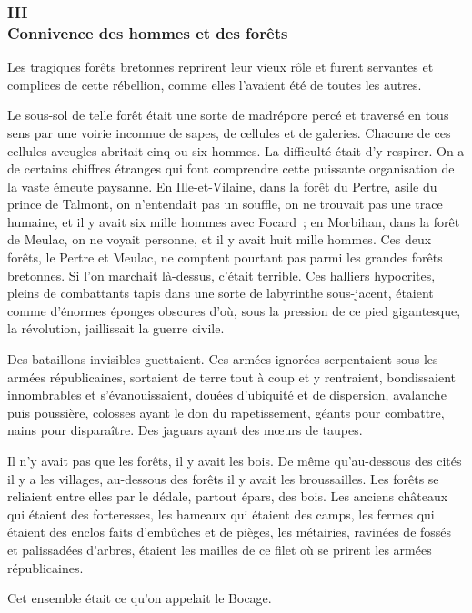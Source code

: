 \documentclass[french,twoside]{book} %
\begin{document}
 \subsubsection[{III. Connivence des hommes et des forêts}]{III \\
Connivence des hommes et des forêts}
\label{p3l1c3}
\noindent Les tragiques forêts bretonnes reprirent leur vieux rôle et furent servantes et complices de cette rébellion, comme elles l’avaient été de toutes les autres.\par
Le sous-sol de telle forêt était une sorte de madrépore percé et traversé en tous sens par une voirie inconnue de sapes, de cellules et de galeries. Chacune de ces cellules aveugles abritait cinq ou six hommes. La difficulté était d’y respirer. On a de certains chiffres étranges qui font comprendre cette puissante organisation de la vaste émeute paysanne. En Ille-et-Vilaine, dans la forêt du Pertre, asile du prince de Talmont, on n’entendait pas un souffle, on ne trouvait pas une trace humaine, et il y avait six mille hommes avec Focard ; en Morbihan, dans la forêt de Meulac, on ne voyait personne, et il y avait huit mille hommes. Ces deux forêts, le Pertre et Meulac, ne comptent pourtant pas parmi les grandes forêts bretonnes. Si l’on marchait là-dessus, c’était terrible. Ces halliers hypocrites, pleins de combattants tapis dans une sorte de labyrinthe sous-jacent, étaient comme d’énormes éponges obscures d’où, sous la pression de  ce pied gigantesque, la révolution, jaillissait la guerre civile.\par
Des bataillons invisibles guettaient. Ces armées ignorées serpentaient sous les armées républicaines, sortaient de terre tout à coup et y rentraient, bondissaient innombrables et s’évanouissaient, douées d’ubiquité et de dispersion, avalanche puis poussière, colosses ayant le don du rapetissement, géants pour combattre, nains pour disparaître. Des jaguars ayant des mœurs de taupes.\par
Il n’y avait pas que les forêts, il y avait les bois. De même qu’au-dessous des cités il y a les villages, au-dessous des forêts il y avait les broussailles. Les forêts se reliaient entre elles par le dédale, partout épars, des bois. Les anciens châteaux qui étaient des forteresses, les hameaux qui étaient des camps, les fermes qui étaient des enclos faits d’embûches et de pièges, les métairies, ravinées de fossés et palissadées d’arbres, étaient les mailles de ce filet où se prirent les armées républicaines.\par
Cet ensemble était ce qu’on appelait le Bocage.\par
\end{document}
